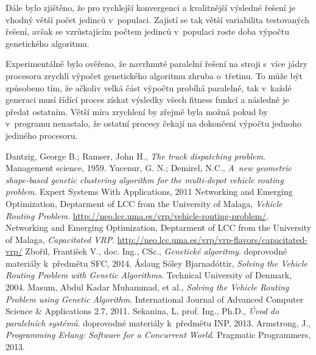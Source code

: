 \documentclass[a4paper]{article}
\begin{document}
Dále bylo zjištěno, že pro rychlejší konvergenci a kvalitnější výsledné řešení je vhodný větší počet jedinců v~populaci. Zajistí se tak větší variabilita testovaných řešení, avšak se vzrůstajícím počtem jedinců v~populaci roste doba výpočtu genetického algoritmu.

Experimentálně bylo ověřeno, že navrhnuté paralelní řešení na stroji s~více jádry procesoru zrychlí výpočet genetického algoritmu zhruba o~třetinu. To může být způsobeno tím, že ačkoliv velká část výpočtu probíhá paralelně, tak v~každé generaci musí řídící proces získat výsledky všech fitness funkcí a následně je předat ostatním. Větší míra zrychlení by zřejmě byla možná pokud by v~programu nenastalo, že ostatní procesy čekají na dokončení výpočtu jednoho jediného procesoru.

\begin{thebibliography}{9}
Dantzig, George B.; Ramser, John H.,
\emph{The truck dispatching problem}.
Management science, 1959.
Yucenur, G. N.; Demirel, N.C.,
\emph{A~new geometric shape-based genetic clustering algorithm for the multi-depot vehicle routing problem}.
Expert Systems With Applications, 2011
Networking and Emerging Optimization, Deptarment of LCC from the University of Malaga,
\emph{Vehicle Routing Problem}.
\url{http://neo.lcc.uma.es/vrp/vehicle-routing-problem/}.
Networking and Emerging Optimization, Deptarment of LCC from the University of Malaga,
\emph{Capacitated VRP}.
\url{http://neo.lcc.uma.es/vrp/vrp-flavors/capacitated-vrp/}
Zbořil, František V., doc. Ing., CSc.,
\emph{Genetické algoritmy}.
doprovodné materiály k~předmětu SFC,
2014.
Áslaug Sóley Bjarnadóttir,
\emph{Solving the Vehicle Routing Problem with Genetic Algorithms}.
Technical University of Denmark,
2004.
Masum, Abdul Kadar Muhammad, et al.,
\emph{Solving the Vehicle Routing Problem using Genetic Algorithm}.
International Journal of Advanced Computer Science \& Applications 2.7,
2011.
Sekanina, L, prof. Ing., Ph.D.,
\emph{Úvod do paralelních systémů}.
doprovodné materiály k~předmětu INP,
2013.
Armstrong, J.,
\emph{Programming Erlang: Software for a Concurrent World}.
Pragmatic Programmers,
2013.
\end{thebibliography}
\end{document}
